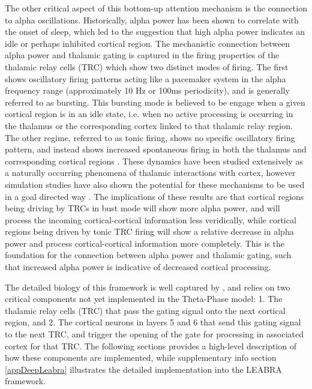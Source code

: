\documentclass[11pt, titlepage, twoside]{article}
\begin{document}
The other critical aspect of this bottom-up attention mechanism is the connection to alpha oscillations.  Historically, alpha power has been shown to correlate with the onset of sleep, which led to the suggestion that high alpha power indicates an idle or perhaps inhibited cortical region.  The mechanistic connection between alpha power and thalamic gating is captured in the firing properties of the thalamic relay cells (TRC) which show two distinct modes of firing.  The first shows oscillatory firing patterns acting like a pacemaker system in the alpha frequency range (approximately 10 Hz or 100ms periodicity), and is generally referred to as bursting.  This bursting mode is believed to be engage when a given cortical region is in an idle state, i.e. when no active processing is occurring in the thalamus or the corresponding cortex linked to that thalamic relay region.  The other regime, referred to as tonic firing, shows no specific oscillatory firing pattern, and instead shows increased spontaneous firing in both the thalamus and corresponding cortical regions \cite{LerescheLightowlerSolteszEtAl91,ShermanGuillery06,LopesdaSilva91}.  These dynamics have been studied extensively as a naturally occurring phenomena of thalamic interactions with cortex, however simulation studies have also shown the potential for these mechanisms to be used in a goal directed way \cite{HindriksvanPutten13,VijayanKopell12,LeeWhittingtonKopell13}. The implications of these results are that cortical regions being driving by TRCs in bust mode will show more alpha power, and will process the incoming cortical-cortical information less veridically, while cortical regions being driven by tonic TRC firing will show a relative decrease in alpha power and process cortical-cortical information more completely.  This is the foundation for the connection between alpha power and thalamic gating, such that increased alpha power is indicative of decreased cortical processing.

The detailed biology of this framework is well captured by \textcite{ShermanGuillery06}, and relies on two critical components not yet implemented in the Theta-Phase model: 1. The thalamic relay cells (TRC) that pass the gating signal onto the next cortical region, and 2. The cortical neurons in layers 5 and 6 that send this gating signal to the next TRC, and trigger the opening of the gate for processing in associated cortex for that TRC.  The following sections provides a high-level description of how these components are implemented, while supplementary info section \ref{appDeepLeabra} illustrates the detailed implementation into the LEABRA framework.
\end{document}
